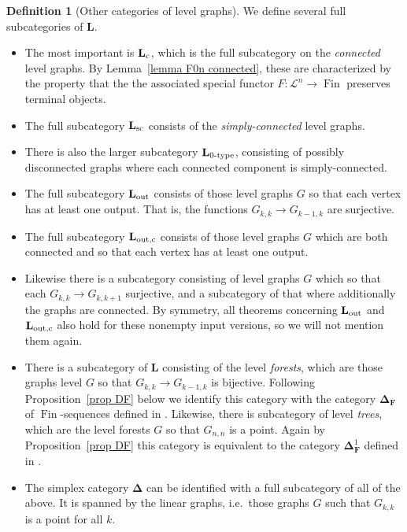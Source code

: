 \documentclass{amsart}
\numberwithin{theorem}{subsection}
\theoremstyle{definition}
\newtheorem{definition}[theorem]{Definition}
\newcommand{\finset}{\operatorname{Fin}}
\newcommand{\finsetskel}{\mathbf{F}}
\newcommand{\name}[1]{\ensuremath{\text{\textup{#1}}}}
\newcommand{\simp}{\mathbf{\Delta}}
\newcommand{\levelg}{\mathbf{L}}
\newcommand{\levelgconn}{\levelg_{\name{c}}}
\newcommand{\scriptyell}{\mathscr L}
\begin{document}
\begin{definition}[Other categories of level graphs]
\label{def subcategories of levelg}
We define several full subcategories of $\levelg$.
\begin{itemize}
\item The most important is $\levelgconn$, which is the full subcategory on the \emph{connected} level graphs.
By Lemma~\ref{lemma F0n connected}, these are characterized by the property that the the associated special functor $F \colon \scriptyell^n \to \finset$ preserves terminal objects.
\item The full subcategory $\levelg_{\name{sc}}$ consists of the \emph{simply-connected} level graphs.
\item There is also the larger subcategory $\levelg_{\name{0-type}}$, consisting of possibly disconnected graphs where each connected component is simply-connected.
\item The full subcategory $\levelg_{\name{out}}$ consists of those level graphs $G$ so that each vertex has at least one output. That is, the functions $G_{k,k} \to G_{k-1,k}$ are surjective.
\item The full subcategory $\levelg_{\name{out,c}}$ consists of those level graphs $G$ which are both connected and so that each vertex has at least one output.
\item Likewise there is a subcategory consisting of level graphs $G$ which so that each $G_{k,k} \to G_{k,k+1}$ surjective, and a subcategory of that where additionally the graphs are connected.
By symmetry, all theorems concerning $\levelg_{\name{out}}$ and $\levelg_{\name{out,c}}$ also hold for these nonempty input versions, so we will not mention them again.
\item There is a subcategory of $\levelg$ consisting of the level \emph{forests}, which are those graphs level $G$ so that $G_{k,k} \to G_{k-1,k}$ is bijective.
Following Proposition~\ref{prop DF} below we identify this category with the category $\simp_\finsetskel$ of $\finset$-sequences defined in \cite{bar}. 
Likewise, there is subcategory of level \emph{trees}, which are the level forests $G$ so that $G_{n,n}$ is a point. 
Again by Proposition~\ref{prop DF} this category is equivalent to the category $\simp^1_\finsetskel$ defined in \cite{ChuHaugsengHeuts}.
\item The simplex category $\simp$ can be identified with a full subcategory of all of the above.
It is spanned by the linear graphs, i.e.\ those graphs $G$ such that $G_{k,k}$ is a point for all $k$.
\end{itemize}
\end{definition}
\end{document}
